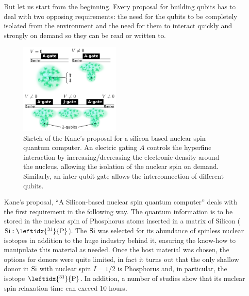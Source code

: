 But let us start from the beginning. Every proposal for building qubits has to deal with two opposing requirements: the need for the qubits to be completely isolated from the environment and the need for them to interact quickly and strongly on demand so they can be read or written to.
\begin{figure}
\centering
\vspace{-10pt}
\includegraphics[width=0.45\textwidth]{introduction/figures/kane.pdf}
\vspace{-7pt}
\caption{Sketch of the Kane's proposal for a silicon-based nuclear spin quantum computer. An electric gating $A$ controls the hyperfine interaction by increasing/decreasing the electronic density around the nucleus, allowing the isolation of the nuclear spin on demand. Similarly, an inter-qubit gate allows the interconnection of different qubits.}
\label{kane_proposal}
\end{figure}
\FloatBarrier
Kane's proposal\cite{Kane1988}, ``A Silicon-based nuclear spin quantum computer'' deals with the first requirement in the following way. The quantum information is to be stored in the nuclear spin of Phosphorus atoms inserted in a matrix of Silicon ($\ce{Si}:\leftidx{^{31}}{\ce{P}}$). The $\ce{Si}$ was selected for its abundance of spinless nuclear isotopes in addition to the huge industry behind it, ensuring the know-how to manipulate this material as needed. Once the host material was chosen, the options for donors were quite limited, in fact it turns out that the only shallow donor in $\ce{Si}$ with nuclear spin $I=1/2$ is Phosphorus\cite{Feher1959,Wilson1961} and, in particular, the isotope $\leftidx{^{31}}{\ce{P}}$. In addition, a number of studies show that its nuclear spin relaxation time can exceed 10 hours\cite{Feher1959, Wilson1961, Waugh1988}. %

